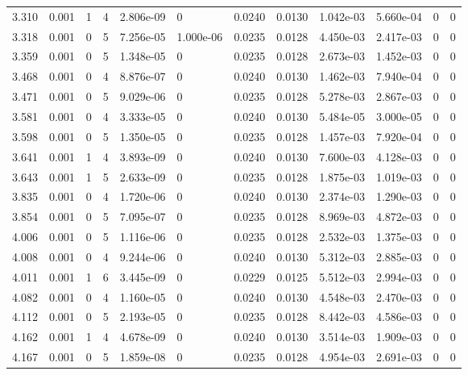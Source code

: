 \documentclass[preview]{standalone}
\begin{document}
{{{\begin{tabular}{L{1.2cm}C{1.2cm} C{0.3cm}C{0.5cm} C{1.4cm}C{1.4cm} C{1.4cm}C{1.4cm} C{1.6cm}C{1.6cm} C{1.6cm}C{1.6cm}}
  3.310  &  0.001  & 1     &  4 &  2.806e-09  & 0  &  0.0240&   0.0130& 1.042e-03 & 5.660e-04   &  0 & 0  \\ 
  3.318  &  0.001  & 0     &  5 &  7.256e-05  & 1.000e-06  &  0.0235&   0.0128& 4.450e-03 & 2.417e-03   &  0 & 0  \\ 
  3.359  &  0.001  & 0     &  5 &  1.348e-05  & 0  &  0.0235&   0.0128& 2.673e-03 & 1.452e-03   &  0 & 0  \\ 
  3.468  &  0.001  & 0     &  4 &  8.876e-07  & 0  &  0.0240&   0.0130& 1.462e-03 & 7.940e-04   &  0 & 0  \\ 
  3.471  &  0.001  & 0     &  5 &  9.029e-06  & 0  &  0.0235&   0.0128& 5.278e-03 & 2.867e-03   &  0 & 0  \\ 
  3.581  &  0.001  & 0     &  4 &  3.333e-05  & 0  &  0.0240&   0.0130& 5.484e-05 & 3.000e-05   &  0 & 0  \\ 
  3.598  &  0.001  & 0     &  5 &  1.350e-05  & 0  &  0.0235&   0.0128& 1.457e-03 & 7.920e-04   &  0 & 0  \\ 
  3.641  &  0.001  & 1     &  4 &  3.893e-09  & 0  &  0.0240&   0.0130& 7.600e-03 & 4.128e-03   &  0 & 0  \\ 
  3.643  &  0.001  & 1     &  5 &  2.633e-09  & 0  &  0.0235&   0.0128& 1.875e-03 & 1.019e-03   &  0 & 0  \\ 
  3.835  &  0.001  & 0     &  4 &  1.720e-06  & 0  &  0.0240&   0.0130& 2.374e-03 & 1.290e-03   &  0 & 0  \\ 
  3.854  &  0.001  & 0     &  5 &  7.095e-07  & 0  &  0.0235&   0.0128& 8.969e-03 & 4.872e-03   &  0 & 0  \\ 
  4.006  &  0.001  & 0     &  5 &  1.116e-06  & 0  &  0.0235&   0.0128& 2.532e-03 & 1.375e-03   &  0 & 0  \\ 
  4.008  &  0.001  & 0     &  4 &  9.244e-06  & 0  &  0.0240&   0.0130& 5.312e-03 & 2.885e-03   &  0 & 0  \\ 
  4.011  &  0.001  & 1     &  6 &  3.445e-09  & 0  &  0.0229&   0.0125& 5.512e-03 & 2.994e-03   &  0 & 0  \\ 
  4.082  &  0.001  & 0     &  4 &  1.160e-05  & 0  &  0.0240&   0.0130& 4.548e-03 & 2.470e-03   &  0 & 0  \\ 
  4.112  &  0.001  & 0     &  5 &  2.193e-05  & 0  &  0.0235&   0.0128& 8.442e-03 & 4.586e-03   &  0 & 0  \\ 
  4.162  &  0.001  & 1     &  4 &  4.678e-09  & 0  &  0.0240&   0.0130& 3.514e-03 & 1.909e-03   &  0 & 0  \\ 
  4.167  &  0.001  & 0     &  5 &  1.859e-08  & 0  &  0.0235&   0.0128& 4.954e-03 & 2.691e-03   &  0 & 0  \\ 

\end{tabular}}}}
\end{document}
